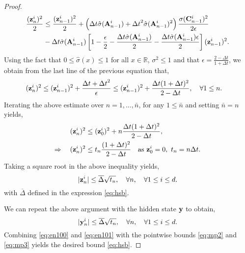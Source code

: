 \documentclass{article} \usepackage{iclr2022_conference,times}
\newcommand{\by}{{\bf y}}
\newcommand{\bz}{{\bf z}}
\newcommand{\bA}{{\bf A}}
\newcommand{\bC}{{\bf C}}
\newcommand{\R}{{\mathbb R}}
\newcommand{\Dt}{{\Delta t}}
\newcommand{\bdel}{\overline{\Delta}}
\begin{document}
\begin{proof}
    \begin{align*}
    \frac{(\bz^i_n)^2}{2} &\leq 
     \frac{(\bz^i_{n-1})^2}{2} +  \left(\Dt \hat{\sigma}(\bA^i_{n-1}) + \Dt^2 \hat{\sigma}(\bA^i_{n-1})^2 \right) \frac{\sigma(\bC^i_{n-1})^2}{2 \epsilon}   \\
     &- \Dt \hat{\sigma}(\bA^i_{n-1}) \left[1 - \frac{\epsilon}{2} - \frac{\Dt \hat{\sigma}(\bA^i_{n-1})}{2} - \frac{\Dt \hat{\sigma}(\bA^i_{n-1}) \epsilon}{2} \right](\bz^i_{n-1})^2 . \\
    \end{align*}
Using the fact that $0 \leq \hat{\sigma}(x) \leq 1$ for all $x \in \R$, $\sigma^2 \leq 1$ and that $\epsilon = \frac{2-\Dt}{1+\Dt}$, we obtain from the last line of the previous equation that,
\begin{align*}
    (\bz_n^i)^2 &\leq (\bz_{n-1}^i)^2 + \frac{\Dt + \Dt^2}{\epsilon} \leq (\bz_{n-1}^i)^2 + \frac{\Dt(1+\Dt)^2}{2-\Dt} , \quad \forall 1 \leq n.
\end{align*}
Iterating the above estimate over $n=1,\ldots,\bar{n}$, for any $1 \leq \bar{n}$ and setting $\bar{n} = n$ yields,
\begin{align*}
    (\bz_n^i)^2 &\leq (\bz_0^i)^2 + n \frac{\Dt(1+\Dt)^2}{2-\Dt}, \\
    \Rightarrow\quad (\bz_n^i)^2 &\leq t_n\frac{(1+\Dt)^2}{2-\Dt} \quad {\rm as}~\bz^i_0 =0,~t_n = n \Dt. 
\end{align*}
Taking a square root in the above inequality yields,
\begin{equation}
    \label{eq:en100}
    |\bz^i_n| \leq \bdel \sqrt{t_n}, \quad \forall n, \quad \forall 1 \leq i \leq d.
\end{equation}
with $\bdel$ defined in the expression \eqref{eq:hsb}. 

We can repeat the above argument with the hidden state $\by$ to obtain,
\begin{equation}
    \label{eq:en101}
    |\by^i_n| \leq \bdel \sqrt{t_n}, \quad \forall n, \quad \forall 1 \leq i \leq d.
\end{equation}
Combining \eqref{eq:en100} and \eqref{eq:en101} with the pointwise bounds \eqref{eq:mp2} and \eqref{eq:mp3} yields the desired bound \eqref{eq:hsb}. 
\end{proof}
\end{document}
